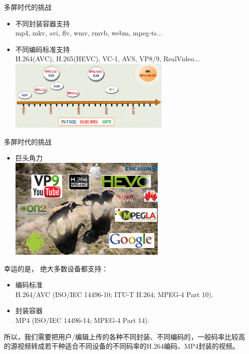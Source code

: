 \documentclass{beamer}
\begin{document}
\begin{frame}{多屏时代的挑战} 
\begin{itemize}
\item 不同封装容器支持\\ %
mp4, mkv, avi, flv, wmv, rmvb, webm, mpeg-ts... \pause
\item 不同编码标准支持\\ \pause
H.264(AVC), H.265(HEVC), VC-1, AVS, VP8/9, RealVideo...
\pause
\includegraphics[height=3.5cm]{fig/encoding_standards.png}\pause
\end{itemize}
\end{frame}
\begin{frame}{多屏时代的挑战} 
\begin{itemize}
\item 巨头角力\\ %
\includegraphics[height=5cm]{fig/competition.jpg}\pause
\end{itemize}
\end{frame}
\begin{frame}{幸运的是，}
\pause
绝大多数设备都支持：
\pause
\begin{itemize}
\item 编码标准\\ \pause
\small{H.264/AVC (ISO/IEC 14496-10;  ITU-T H.264; MPEG-4 Part 10).}
\item 封装容器\\ \pause
\small{MP4 (ISO/IEC 14496-14; MPEG-4 Part 14).}
\end{itemize}
\pause
所以，我们需要把用户/编辑上传的各种不同封装、不同编码的，一般码率比较高的源视频转成若干种适合不同设备的不同码率的H.264编码、MP4封装的视频。
\end{frame}
\end{document}
